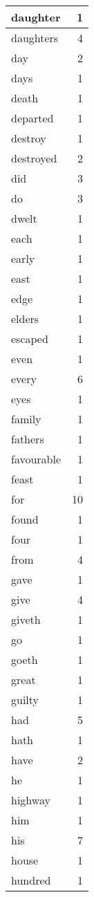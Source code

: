 \begin{center}
\begin{longtable}{l|r}
daughter & 1 \\ \hline
daughters & 4 \\ \hline
day & 2 \\ \hline
days & 1 \\ \hline
death & 1 \\ \hline
departed & 1 \\ \hline
destroy & 1 \\ \hline
destroyed & 2 \\ \hline
did & 3 \\ \hline
do & 3 \\ \hline
dwelt & 1 \\ \hline
each & 1 \\ \hline
early & 1 \\ \hline
east & 1 \\ \hline
edge & 1 \\ \hline
elders & 1 \\ \hline
escaped & 1 \\ \hline
even & 1 \\ \hline
every & 6 \\ \hline
eyes & 1 \\ \hline
family & 1 \\ \hline
fathers & 1 \\ \hline
favourable & 1 \\ \hline
feast & 1 \\ \hline
for & 10 \\ \hline
found & 1 \\ \hline
four & 1 \\ \hline
from & 4 \\ \hline
gave & 1 \\ \hline
give & 4 \\ \hline
giveth & 1 \\ \hline
go & 1 \\ \hline
goeth & 1 \\ \hline
great & 1 \\ \hline
guilty & 1 \\ \hline
had & 5 \\ \hline
hath & 1 \\ \hline
have & 2 \\ \hline
he & 1 \\ \hline
highway & 1 \\ \hline
him & 1 \\ \hline
his & 7 \\ \hline
house & 1 \\ \hline
hundred & 1 \\ \hline

\end{longtable}
\end{center}
